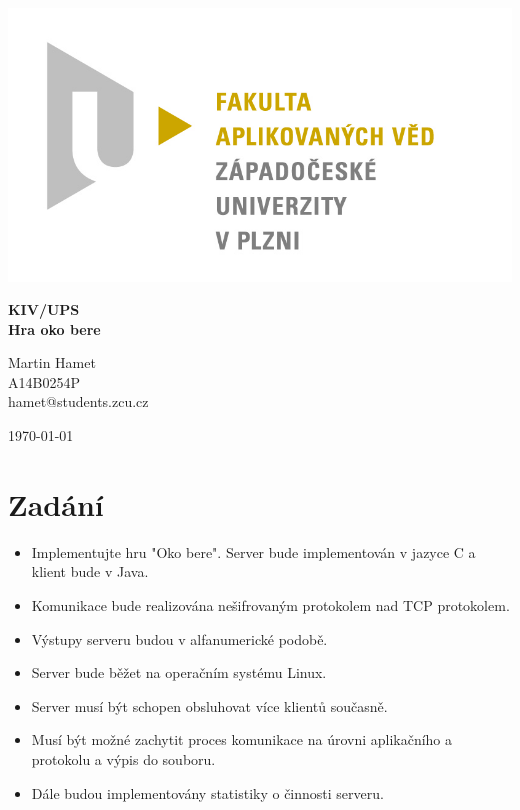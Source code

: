 \documentclass[12pt]{article}
\begin{document}

\begin{titlepage}
\includegraphics[scale=0.2, trim=5cm 0 0 30cm]{logo.jpg}
\begin{center}
\vspace{5cm}
{\Huge
\textbf{KIV/UPS}\\
\vspace{1cm}
}
{\Large
\textbf{Hra oko bere}
}
\end{center}
\vspace{\fill}

\begin{minipage}[t]{5cm}
\flushleft
Martin Hamet\\
A14B0254P\\
hamet@students.zcu.cz
\end{minipage}
\hfill
\begin{minipage}[t]{7cm}
\flushright
\today
\end{minipage}
\end{titlepage}

\tableofcontents
\newpage
\section{Zadání}
\begin{itemize}
\setlength\itemsep{1px}
\renewcommand\labelitemi{--}
\item Implementujte hru "Oko bere". Server bude implementován v jazyce C a klient bude v Java.
\item Komunikace bude realizována nešifrovaným protokolem nad TCP protokolem.
\item Výstupy serveru budou v alfanumerické podobě.
\item Server bude běžet na operačním systému Linux.
\item Server musí být schopen obsluhovat více klientů současně.
\item Musí být možné zachytit proces komunikace na úrovni aplikačního a protokolu a výpis do souboru.
\item Dále budou implementovány statistiky o činnosti serveru.
\end{itemize}
\end{document}
